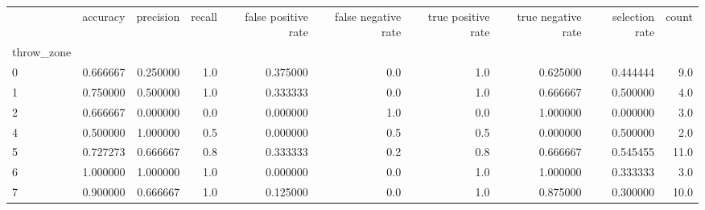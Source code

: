 \begin{tabular}{lrrrrrrrrr}
\toprule
{} &  accuracy &  precision &  recall &  false positive rate &  false negative rate &  true positive rate &  true negative rate &  selection rate &  count \\
throw\_zone &           &            &         &                      &                      &                     &                     &                 &        \\
\midrule
0          &  0.666667 &   0.250000 &     1.0 &             0.375000 &                  0.0 &                 1.0 &            0.625000 &        0.444444 &    9.0 \\
1          &  0.750000 &   0.500000 &     1.0 &             0.333333 &                  0.0 &                 1.0 &            0.666667 &        0.500000 &    4.0 \\
2          &  0.666667 &   0.000000 &     0.0 &             0.000000 &                  1.0 &                 0.0 &            1.000000 &        0.000000 &    3.0 \\
4          &  0.500000 &   1.000000 &     0.5 &             0.000000 &                  0.5 &                 0.5 &            0.000000 &        0.500000 &    2.0 \\
5          &  0.727273 &   0.666667 &     0.8 &             0.333333 &                  0.2 &                 0.8 &            0.666667 &        0.545455 &   11.0 \\
6          &  1.000000 &   1.000000 &     1.0 &             0.000000 &                  0.0 &                 1.0 &            1.000000 &        0.333333 &    3.0 \\
7          &  0.900000 &   0.666667 &     1.0 &             0.125000 &                  0.0 &                 1.0 &            0.875000 &        0.300000 &   10.0 \\
\bottomrule
\end{tabular}
